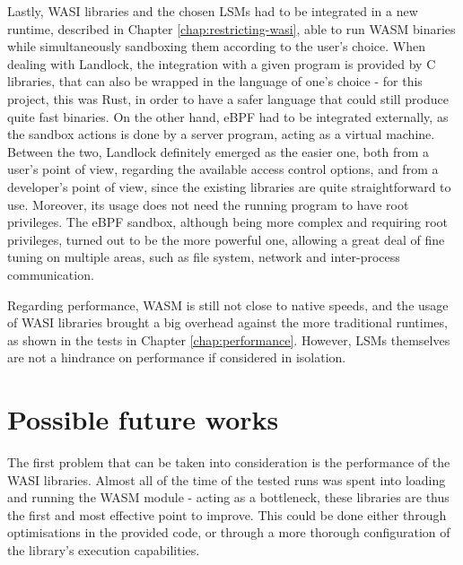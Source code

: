 Lastly, WASI libraries and the chosen LSMs had to be integrated in a new runtime, described in
Chapter \ref{chap:restricting-wasi}, able to run WASM binaries while simultaneously sandboxing them according to the user's choice.
When dealing with Landlock, the integration with a given program is provided by C libraries,
that can also be wrapped in the language of one's choice - for this project, this was Rust,
in order to have a safer language that could still produce quite fast binaries.
On the other hand, eBPF had to be integrated externally, as the sandbox actions is done by
a server program, acting as a virtual machine.
Between the two, Landlock definitely emerged as the easier one, both from a user's point of view,
regarding the available access control options, and from a developer's point of view, since
the existing libraries are quite straightforward to use. Moreover, its usage does not need the running program
to have root privileges.
The eBPF sandbox, although being more complex and requiring root privileges, turned out to be
the more powerful one, allowing a great deal of fine tuning on multiple areas,
such as file system, network and inter-process communication.

Regarding performance, WASM is still not close to native speeds, and the usage of WASI libraries
brought a big overhead against the more traditional runtimes, as shown in the tests in Chapter \ref{chap:performance}.
However, LSMs themselves are not a hindrance on performance if considered in isolation.

\section{Possible future works}

The first problem that can be taken into consideration is the performance of the WASI libraries.
Almost all of the time of the tested runs was spent into loading and running the WASM module -
acting as a bottleneck, these libraries are thus the first and most effective point to improve.
This could be done either through optimisations in the provided code, or through a more thorough
configuration of the library's execution capabilities.

